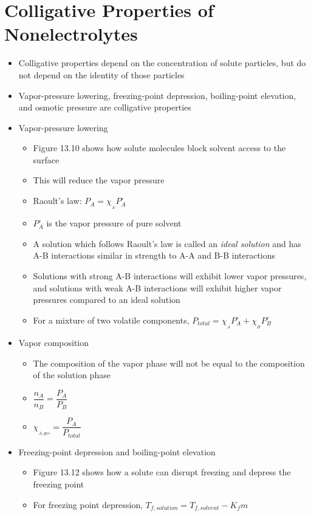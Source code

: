 \documentclass[12pt, openany, letterpaper]{memoir}
\begin{document}
\section{Colligative Properties of Nonelectrolytes}
\begin{itemize}
	\item Colligative properties depend on the concentration of solute particles, but do not depend on the identity of those particles
	\item Vapor-pressure lowering, freezing-point depression, boiling-point elevation, and osmotic pressure are colligative properties
	\item Vapor-pressure lowering
	\begin{itemize}
		\item Figure 13.10 shows how solute molecules block solvent access to the surface
		\item This will reduce the vapor pressure
		\item Raoult's law: $P_A=\chi_{_A}P^\circ_A$
		\item $P^\circ_A$ is the vapor pressure of pure solvent 
		\item A solution which follows Raoult's law is called an \emph{ideal solution} and has A-B interactions similar in strength to A-A and B-B interactions
		\item Solutions with strong A-B interactions will exhibit lower vapor pressures, and solutions with weak A-B interactions will exhibit higher vapor pressures compared to an ideal solution
		\item For a mixture of two volatile components, $P_{total} = \chi_{_A}P^\circ_A + \chi_{_B}P^\circ_B$
	\end{itemize}
	\item Vapor composition
	\begin{itemize}
		\item The composition of the vapor phase will not be equal to the composition of the solution phase
		\item $\dfrac{n_A}{n_B} = \dfrac{P_A}{P_B}$
		\item $\chi_{_{A,gas}}=\dfrac{P_A}{P_{total}}$
	\end{itemize}
	\item Freezing-point depression and boiling-point elevation
	\begin{itemize}
		\item Figure 13.12 shows how a solute can disrupt freezing and depress the freezing point
		\item For freezing point depression, $T_{f,solution}=T_{f,solvent}-K_fm$

\end{itemize}
\end{itemize}
\end{document}
